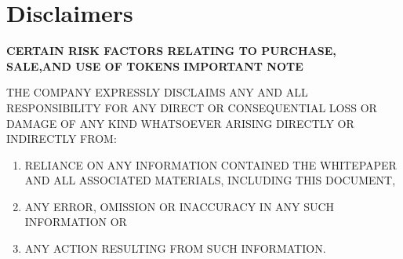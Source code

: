 \section{Disclaimers}\label{diclaimers}

\begin{center}
\textbf{CERTAIN RISK FACTORS RELATING TO PURCHASE, SALE,AND USE OF TOKENS}
\textbf{IMPORTANT NOTE}
\end{center}

THE COMPANY EXPRESSLY DISCLAIMS ANY AND ALL RESPONSIBILITY FOR ANY DIRECT OR CONSEQUENTIAL LOSS OR DAMAGE OF ANY KIND WHATSOEVER ARISING DIRECTLY OR INDIRECTLY FROM: 
\begin{enumerate}
   \begin{enumerate}
     \begin{enumerate}
       \begin{enumerate}
         \item RELIANCE ON ANY INFORMATION CONTAINED THE WHITEPAPER AND ALL ASSOCIATED MATERIALS, INCLUDING THIS DOCUMENT,
         \item ANY ERROR, OMISSION OR INACCURACY IN ANY SUCH INFORMATION OR
         \item ANY ACTION RESULTING FROM SUCH INFORMATION.
       \end{enumerate}
     \end{enumerate}
   \end{enumerate}
 \end{enumerate}


